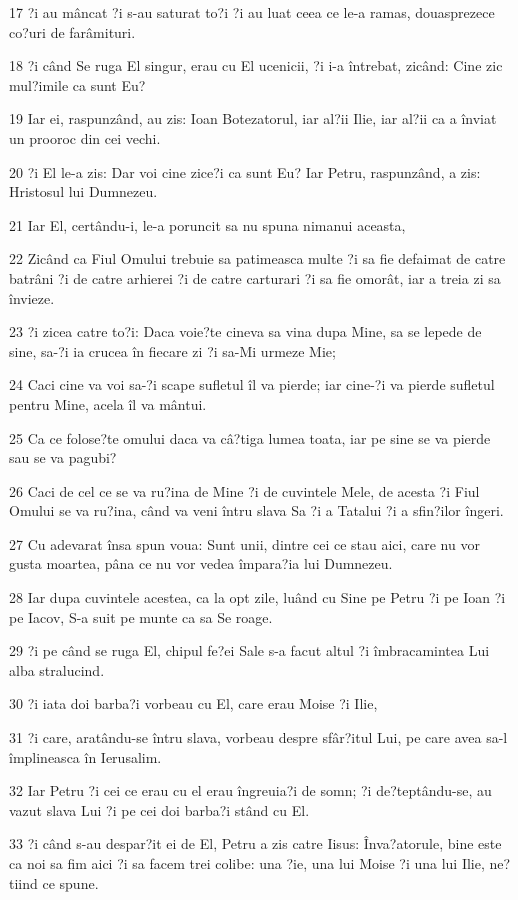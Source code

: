 \par 17 ?i au mâncat ?i s-au saturat to?i ?i au luat ceea ce le-a ramas, douasprezece co?uri de farâmituri.
\par 18 ?i când Se ruga El singur, erau cu El ucenicii, ?i i-a întrebat, zicând: Cine zic mul?imile ca sunt Eu?
\par 19 Iar ei, raspunzând, au zis: Ioan Botezatorul, iar al?ii Ilie, iar al?ii ca a înviat un prooroc din cei vechi.
\par 20 ?i El le-a zis: Dar voi cine zice?i ca sunt Eu? Iar Petru, raspunzând, a zis: Hristosul lui Dumnezeu.
\par 21 Iar El, certându-i, le-a poruncit sa nu spuna nimanui aceasta,
\par 22 Zicând ca Fiul Omului trebuie sa patimeasca multe ?i sa fie defaimat de catre batrâni ?i de catre arhierei ?i de catre carturari ?i sa fie omorât, iar a treia zi sa învieze.
\par 23 ?i zicea catre to?i: Daca voie?te cineva sa vina dupa Mine, sa se lepede de sine, sa-?i ia crucea în fiecare zi ?i sa-Mi urmeze Mie;
\par 24 Caci cine va voi sa-?i scape sufletul îl va pierde; iar cine-?i va pierde sufletul pentru Mine, acela îl va mântui.
\par 25 Ca ce folose?te omului daca va câ?tiga lumea toata, iar pe sine se va pierde sau se va pagubi?
\par 26 Caci de cel ce se va ru?ina de Mine ?i de cuvintele Mele, de acesta ?i Fiul Omului se va ru?ina, când va veni întru slava Sa ?i a Tatalui ?i a sfin?ilor îngeri.
\par 27 Cu adevarat însa spun voua: Sunt unii, dintre cei ce stau aici, care nu vor gusta moartea, pâna ce nu vor vedea împara?ia lui Dumnezeu.
\par 28 Iar dupa cuvintele acestea, ca la opt zile, luând cu Sine pe Petru ?i pe Ioan ?i pe Iacov, S-a suit pe munte ca sa Se roage.
\par 29 ?i pe când se ruga El, chipul fe?ei Sale s-a facut altul ?i îmbracamintea Lui alba stralucind.
\par 30 ?i iata doi barba?i vorbeau cu El, care erau Moise ?i Ilie,
\par 31 ?i care, aratându-se întru slava, vorbeau despre sfâr?itul Lui, pe care avea sa-l împlineasca în Ierusalim.
\par 32 Iar Petru ?i cei ce erau cu el erau îngreuia?i de somn; ?i de?teptându-se, au vazut slava Lui ?i pe cei doi barba?i stând cu El.
\par 33 ?i când s-au despar?it ei de El, Petru a zis catre Iisus: Înva?atorule, bine este ca noi sa fim aici ?i sa facem trei colibe: una ?ie, una lui Moise ?i una lui Ilie, ne?tiind ce spune.
